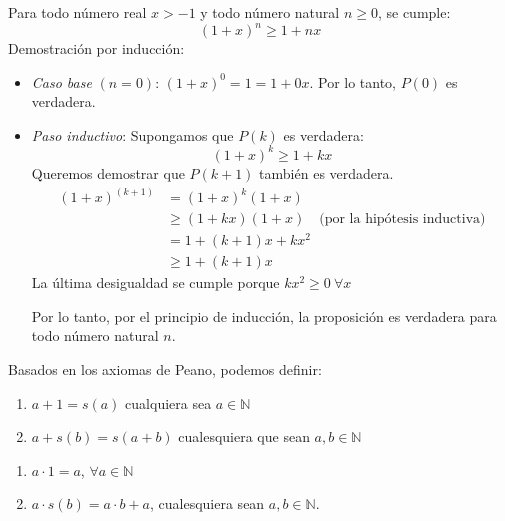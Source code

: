 \begin{fmd-example}
	Para todo número real $x > -1$ y todo número natural $n \geq 0$, se cumple:
	\[ (1+x)^n \geq 1 + nx  \]
	Demostración por inducción:
	
	\begin{itemize}
		\item \textit{Caso base} $(n=0)$: $(1+x)^0 = 1 = 1 + 0x$. Por lo tanto, $P(0)$ es verdadera.
		
		\item \textit{Paso inductivo}: Supongamos que $P(k)$ es verdadera:
		\[ (1+x)^k \geq 1 + kx \]
		Queremos demostrar que $P(k+1)$ también es verdadera.
		\[ \begin{split}
			(1 + x)^{(k+1)} &= (1 + x)^k (1 + x) \\
			& \geq (1+kx)(1+x) \quad \text{(por la hipótesis inductiva)} \\
			& = 1 + (k+1)x + kx^2 \\
			& \geq 1 + (k+1)x
		\end{split} \]
		La última desigualdad se cumple porque $kx^2 \geq 0 \ \forall x$
		
		Por lo tanto, por el principio de inducción, la proposición es verdadera para todo número natural $n$.
	\end{itemize}
\end{fmd-example}



Basados en los axiomas de Peano, podemos definir:

\begin{fmd-definition}[Adición en $\N$]
	\begin{enumerate}[label=\alph*)]
		\item $a + 1 = s(a)$ cualquiera sea $a \in \mathbb{N}$
		\item $a + s(b) = s(a + b)$ cualesquiera que sean $a, b \in \mathbb{N}$
	\end{enumerate}
\end{fmd-definition}

\begin{fmd-definition}[Multiplicación en $\N$]
	\begin{enumerate}[label=\alph*)]
		\item $a \cdot 1 = a$, $\forall a \in \mathbb{N}$
		\item $a \cdot s(b) = a \cdot b + a$, cualesquiera sean $a, b \in \mathbb{N}$.
	\end{enumerate}
\end{fmd-definition}

